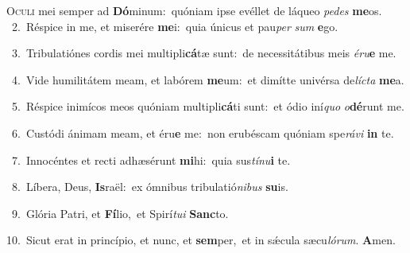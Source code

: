 \lettrine{\initial\textcolor{\initialcolor}{O}}{culi} mei semper ad \textbf{Dó}\-minum:~\star quóniam ipse evéllet de láqueo \textit{pe}\-\textit{des} \textbf{me}\-os.\\
{\numbfont\textcolor{\numbcolor}{~2.}}~Réspice in me, et miserére \textbf{me}\-i:~\star quia únicus et pau\textit{per} \textit{sum} \textbf{e}\-go.\par
{\numbfont\textcolor{\numbcolor}{~3.}}~Tribulatiónes cordis mei multipli\-\textbf{cá}\-tæ sunt:~\star de necessitátibus meis \textit{é}\-\textit{ru}\textbf{e} me.\par
{\numbfont\textcolor{\numbcolor}{~4.}}~Vide humilitátem meam, et labórem \textbf{me}\-um:~\star et dimítte univérsa de\-\textit{líc}\-\textit{ta} \textbf{me}\-a.\par
{\numbfont\textcolor{\numbcolor}{~5.}}~Réspice inimícos meos quóniam multipli\-\textbf{cá}\-ti sunt:~\star et ódio iní\textit{quo} \textit{o}\-\textbf{dé}runt me.\par
{\numbfont\textcolor{\numbcolor}{~6.}}~Custódi ánimam meam, et éru\textbf{e} me:~\star non erubéscam quóniam spe\-\textit{rá}\-\textit{vi} \textbf{in} te.\par
{\numbfont\textcolor{\numbcolor}{~7.}}~Innocéntes et recti adhæsérunt \textbf{mi}\-hi:~\star quia sus\-\textit{tí}\-\textit{nu}\textbf{i} te.\par
{\numbfont\textcolor{\numbcolor}{~8.}}~Líbera, Deus, \textbf{Is}\-raël:~\star ex ómnibus tribulatió\-\textit{ni}\-\textit{bus} \textbf{su}\-is.\par
{\numbfont\textcolor{\numbcolor}{~9.}}~Glória Patri, et \textbf{Fí}\-lio,~\star et Spirí\-\textit{tu}\-\textit{i} \textbf{Sanc}\-to.\par
{\numbfont\textcolor{\numbcolor}{10.}}~Sicut erat in princípio, et nunc, et \textbf{sem}\-per,~\star et in sǽcula sæcu\-\textit{ló}\-\textit{rum}. \textbf{A}\-men.\par
